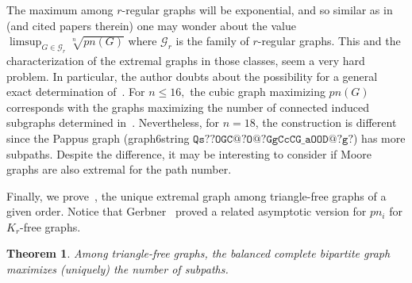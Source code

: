 \documentclass[a4paper,11pt]{article}
\newcommand{\G}{\mathcal G}
\newtheorem{thm}[defi]{Theorem}
\newcommand{\pn}{pn}
\begin{document}
The maximum among $r$-regular graphs will be exponential, and so similar as in~\cite{CJG23} (and cited papers therein) one may wonder about the value $\limsup_{G \in \G_r} \sqrt[n]{\pn(G)}$ where $\G_r$ is the family of $r$-regular graphs.
This and the characterization of the extremal graphs in those classes, seem a very hard problem. In particular, the author doubts about the possibility for 
 a general exact determination of~\cite[Prob.~17]{KSSY25}.
For $n \le 16,$ the cubic graph maximizing $\pn(G)$ corresponds with the graphs maximizing the number of connected induced subgraphs determined in~\cite{CJG23}. 
Nevertheless, for $n=18$, the construction is different since the Pappus graph (graph6string $\texttt{Qs??OGC@?O@?GgCcCG\_aOOD@?g?}$) has more subpaths. Despite the difference, it may be interesting to consider if Moore graphs are also extremal for the path number.

Finally, we prove~\cite[Conj.~18]{KSSY25}, the unique extremal graph among triangle-free graphs of a given order. Notice that Gerbner~\cite{Gerbner23} proved a related asymptotic version for $\pn_i$ for $K_r$-free graphs.
\begin{thm}
    Among triangle-free graphs, the balanced complete bipartite graph maximizes (uniquely) the number of subpaths.
\end{thm}
\end{document}
